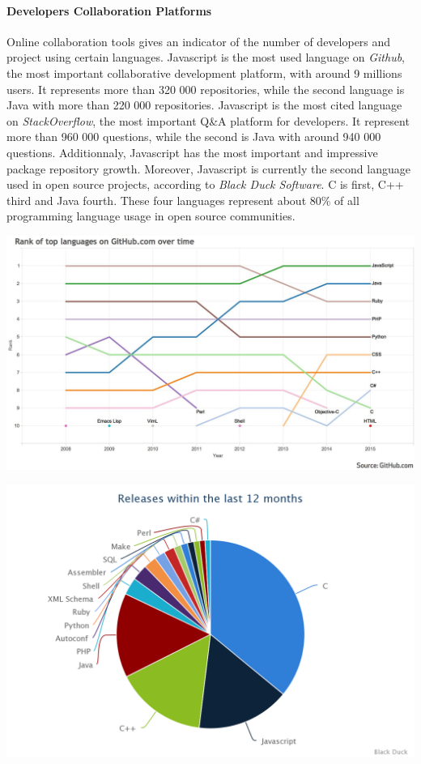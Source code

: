 
\paragraph{Developers Collaboration Platforms}

Online collaboration tools gives an indicator of the number of developers and project using certain languages.
Javascript is the most used language on \textit{Github}, the most important collaborative development platform, with around 9 millions users.
It represents more than 320 000 repositories, while the second language is Java with more than 220 000 repositories.
Javascript is the most cited language on \textit{StackOverflow}, the most important Q\&A platform for developers.
It represent more than 960 000 questions, while the second is Java with around 940 000 questions.
Additionnaly, Javascript has the most important and impressive package repository growth.
Moreover, Javascript is currently the second language used in open source projects, according to \textit{Black Duck Software}.
C is first, C++ third and Java fourth.
These four languages represent about 80\% of all programming language usage in open source communities.

\includegraphics[width=0.9\linewidth]{../../data/js-trends/github-ranks}


\includegraphics[width=0.9\linewidth]{../../data/js-trends/black-duck-15}

